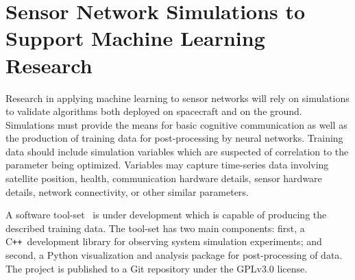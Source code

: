 \documentclass[conference]{IEEEtran}
\newcommand{\project}{{\sc{Collaborate}}~}
\newcommand{\cpp}{C\texttt{++}~}
\begin{document}

\section{Sensor Network Simulations to Support Machine Learning Research}
\label{sec:software}

Research in applying machine learning to sensor networks will rely on simulations to validate algorithms both deployed on spacecraft and on the ground.  Simulations must provide the means for basic cognitive communication as well as the production of training data for post-processing by neural networks.  Training data should include simulation variables which are suspected of correlation to the parameter being optimized.  Variables may capture time-series data involving satellite position, health, communication hardware details, sensor hardware details, network connectivity, or other similar parameters.

A software tool-set \project is under development which is capable of producing the described training data.  The tool-set has two main components: first, a \cpp development library for observing system simulation experiments; and second, a Python visualization and analysis package for post-processing of data.  The project is published to a Git repository under the GPLv3.0 license.
\end{document}
